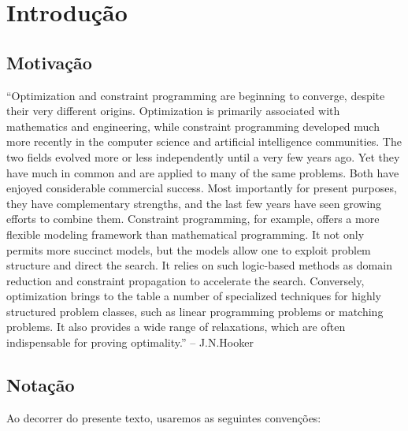 
%


%

\setcounter{tocdepth}{5} %

\tableofcontents

\section*{Introdução}

\subsection*{Motivação}

``Optimization and constraint programming are beginning to converge,
despite their very different origins. Optimization is primarily
associated with mathematics and engineering, while constraint
programming developed much more recently in the computer science and
artificial intelligence communities. The two fields evolved more or
less independently until a very few years ago. Yet they have much in
common and are applied to many of the same problems. Both have enjoyed
considerable commercial success. Most importantly for present
purposes, they have complementary strengths, and the last few years
have seen growing efforts to combine them. Constraint programming, for
example, offers a more flexible modeling framework than mathematical
programming. It not only permits more succinct models, but the models
allow one to exploit problem structure and direct the search. It
relies on such logic-based methods as domain reduction and constraint
propagation to accelerate the search.  Conversely, optimization brings
to the table a number of specialized techniques for highly structured
problem classes, such as linear programming problems or matching
problems. It also provides a wide range of relaxations, which are
often indispensable for proving optimality.'' -- J.N.Hooker

\subsection*{Notação}
  Ao decorrer do presente texto, usaremos as seguintes convenções:

